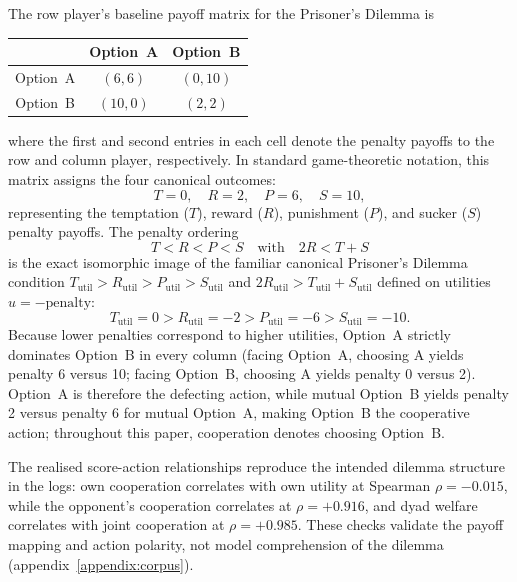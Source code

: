 \documentclass[11pt,a4paper]{article}
\begin{document}
The row player's baseline payoff matrix for the Prisoner's Dilemma is
\begin{center}
\small
\begin{tabular}{c|cc}
 & Option~A & Option~B \\
\hline
Option~A & $(6, 6)$ & $(0, 10)$ \\
Option~B & $(10, 0)$ & $(2, 2)$
\end{tabular}
\end{center}
where the first and second entries in each cell denote the penalty payoffs to
the row and column player, respectively. In standard game-theoretic notation,
this matrix assigns the four canonical outcomes:
\[
T = 0, \quad R = 2, \quad P = 6, \quad S = 10,
\]
representing the temptation ($T$), reward ($R$), punishment ($P$), and sucker
($S$) penalty payoffs. The penalty ordering
\[
T < R < P < S \quad \text{with} \quad 2R < T + S
\]
is the exact isomorphic image of the familiar canonical Prisoner's Dilemma
condition $T_{\text{util}} > R_{\text{util}} > P_{\text{util}} > S_{\text{util}}$
and $2R_{\text{util}} > T_{\text{util}} + S_{\text{util}}$ defined on utilities
$u = -\text{penalty}$:
\[
T_{\text{util}} = 0 > R_{\text{util}} = -2 > P_{\text{util}} = -6 > S_{\text{util}} = -10.
\]
Because lower penalties correspond to higher utilities, Option~A strictly
dominates Option~B in every column (facing Option~A, choosing A yields penalty 6
versus 10; facing Option~B, choosing A yields penalty 0 versus 2). Option~A is
therefore the defecting action, while mutual Option~B yields penalty 2 versus
penalty 6 for mutual Option~A, making Option~B the cooperative action;
throughout this paper, cooperation denotes choosing Option~B.

The realised score-action relationships reproduce the intended dilemma
structure in the logs: own cooperation correlates with own utility at Spearman
$\rho = -0.015$, while the opponent's cooperation correlates at
$\rho = +0.916$, and dyad welfare correlates with joint cooperation at
$\rho = +0.985$. These checks validate the payoff mapping and action polarity,
not model comprehension of the dilemma (appendix~\ref{appendix:corpus}).
\end{document}
